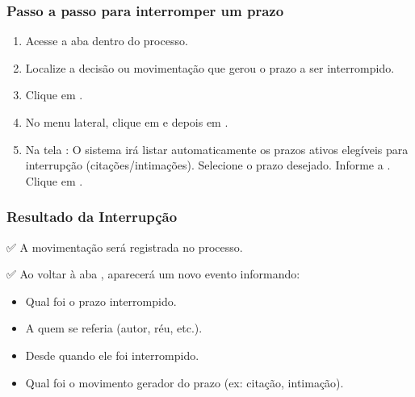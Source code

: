 \documentclass[letterpaper,10pt,brazil]{sphinxmanual}
\begin{document}
\subsubsection{Passo a passo para interromper um prazo}
\label{\detokenize{projud_38_interrupcaoprazo:passo-a-passo-para-interromper-um-prazo}}\begin{enumerate}
%
\item {} 
\sphinxAtStartPar
Acesse a aba  dentro do processo.

\item {} 
\sphinxAtStartPar
Localize a decisão ou movimentação que gerou o prazo a ser interrompido.

\item {} 
\sphinxAtStartPar
Clique em .

\item {} 
\sphinxAtStartPar
No menu lateral, clique em  e depois em .

\begin{sphinxVerbatim}[commandchars=\\\{\}]
\PYG{p}{[}  \PYG{p}{]}
  
      
\end{sphinxVerbatim}

\item {} 
\sphinxAtStartPar
Na tela :
\sphinxhyphen{} O sistema irá listar automaticamente os prazos ativos elegíveis para interrupção (citações/intimações).
\sphinxhyphen{} Selecione o prazo desejado.
\sphinxhyphen{} Informe a .
\sphinxhyphen{} Clique em .

\end{enumerate}


\subsubsection{Resultado da Interrupção}
\label{\detokenize{projud_38_interrupcaoprazo:resultado-da-interrupcao}}
\sphinxAtStartPar
✅ A movimentação será registrada no processo.

\sphinxAtStartPar
✅ Ao voltar à aba , aparecerá um novo evento informando:
\begin{itemize}
\item {} 
\sphinxAtStartPar
Qual foi o prazo interrompido.

\item {} 
\sphinxAtStartPar
A quem se referia (autor, réu, etc.).

\item {} 
\sphinxAtStartPar
Desde quando ele foi interrompido.

\item {} 
\sphinxAtStartPar
Qual foi o movimento gerador do prazo (ex: citação, intimação).

\end{itemize}
\end{document}
